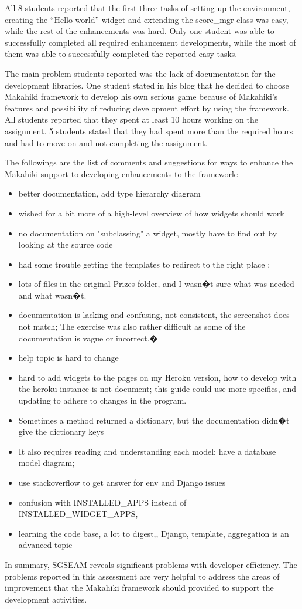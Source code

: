 All 8 students reported that the first three tasks of setting up the environment, creating the  ``Hello world'' widget and extending the score\_mgr class was easy, while the rest of the enhancements was hard. Only one student was able to successfully
completed all required enhancement developments, while the most of them was able to  successfully completed the reported easy tasks. 

The main problem students reported was the lack of documentation for the
development libraries. One student stated in his blog that he decided to choose Makahiki
framework to develop his own serious game because of Makahiki's features and possibility
of reducing development effort by using the framework. All students reported that they spent at least 10 hours working on the assignment. 5 students stated that they had spent more than the required hours and had to move on and not completing the assignment. 

The followings are the list of comments and suggestions for ways to enhance the Makahiki support to developing enhancements to the framework:
\begin{itemize}
\item better documentation, add type hierarchy diagram
\item wished for a bit more of a high-level overview of how widgets should work
\item no documentation on "subclassing" a widget, mostly have to find out by looking at the source code
\item had some trouble getting the templates to redirect to the right place ; 
\item lots of files in the original Prizes folder, and I wasn�t sure what was needed and what wasn�t.
\item documentation is lacking and confusing, not consistent, the screenshot does not match; The exercise was also rather difficult as some of the documentation is vague or incorrect.�
\item help topic is hard to change
\item hard to add widgets to the pages on my Heroku version, how to develop with the heroku instance is not document;   this guide could use more specifics, and updating to adhere to changes in the program.
\item Sometimes a method returned a dictionary, but the documentation didn�t give the dictionary keys
\item It also requires reading and understanding each model; have a database model diagram;
\item use stackoverflow to get answer for env and Django issues
\item confusion with INSTALLED\_APPS instead of INSTALLED\_WIDGET\_APPS,
\item learning the code base, a lot to digest,, Django, template,  aggregation is an advanced topic
\end{itemize}

In summary, SGSEAM reveals significant problems with developer efficiency.
The problems reported in this assessment are very helpful to address the areas of improvement that the Makahiki framework should provided to support the development activities.
